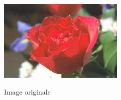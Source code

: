 \begin{figure}[H]
    \centering
    \includegraphics[width=.7\textwidth]{../SRC/testorig.jpg}
    \label{img:1}
    \caption{Image originale}
\end{figure}

